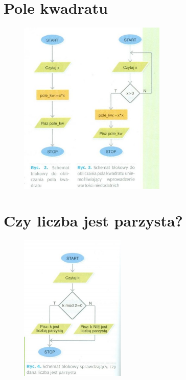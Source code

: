 \documentclass[a4paper,11pt]{article}
\begin{document}
\section{Pole kwadratu}
\begin{figure}[ht]
\centering
\includegraphics[width=7cm]{rys2}
\end{figure}
\newpage

\section{Czy liczba jest parzysta?}
\begin{figure}[ht]
\centering
\includegraphics[width=5cm]{rys3}
\end{figure}
\end{document}
